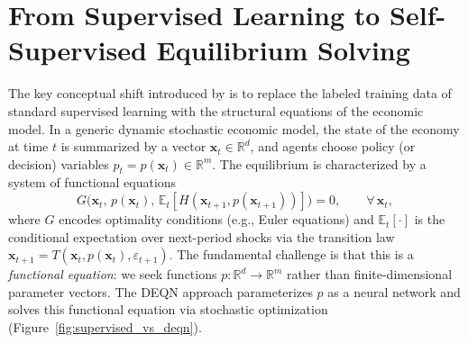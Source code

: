 \documentclass[11pt,a4paper]{report}
\newcommand{\x}{\bm{x}}
\newcommand{\R}{\mathbb{R}}
\begin{document}
\section{From Supervised Learning to Self-Supervised Equilibrium Solving}

The key conceptual shift introduced by \citet{azinovicDEEPEQUILIBRIUMNETS2022} is to replace the labeled training data of standard supervised learning with the structural equations of the economic model.  In a generic dynamic stochastic economic model, the state of the economy at time $t$ is summarized by a vector $\x_t \in \R^d$, and agents choose policy (or decision) variables $p_t = p(\x_t) \in \R^m$.  The equilibrium is characterized by a system of functional equations
\begin{equation}
G\bigl(\x_t,\, p(\x_t),\, \mathbb{E}_t[H(\x_{t+1}, p(\x_{t+1}))]\bigr) = 0, \qquad \forall\, \x_t,
\end{equation}
where $G$ encodes optimality conditions (e.g., Euler equations) and $\mathbb{E}_t[\cdot]$ is the conditional expectation over next-period shocks via the transition law $\x_{t+1} = T(\x_t, p(\x_t), \varepsilon_{t+1})$.  The fundamental challenge is that this is a \emph{functional equation}: we seek functions $p:\R^d \to \R^m$ rather than finite-dimensional parameter vectors.  The DEQN approach parameterizes $p$ as a neural network and solves this functional equation via stochastic optimization (Figure~\ref{fig:supervised_vs_deqn}).
\end{document}
